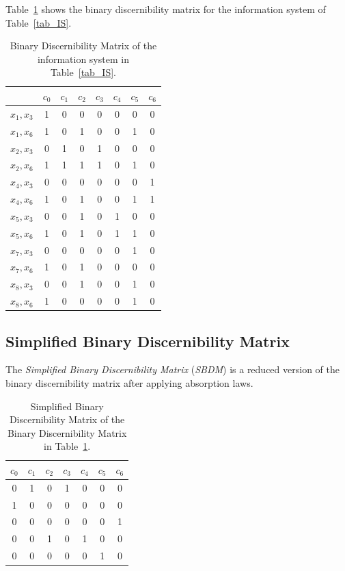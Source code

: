 \documentclass[number,preprint,review,12pt]{elsarticle}
\begin{document}
  Table~\ref{tab_BDM} shows the binary discernibility matrix for the information system of Table~\ref{tab_IS}.  
  
  \begin{table}[htb]
		\caption{Binary Discernibility Matrix of the information system in Table~\ref{tab_IS}.} \label{tab_BDM}
		\centering
 	\begin{tabular}{c|ccccccc}
 		& $c_0$ & $c_1$ & $c_2$ & $c_3$ & $c_4$ & $c_5$ & $c_6$\\
 		\hline
		$x_1,x_3$ & 1 & 0 & 0 & 0 & 0 & 0 & 0 \\
		$x_1,x_6$ & 1 & 0 & 1 & 0 & 0 & 1 & 0 \\
		$x_2,x_3$ & 0 & 1 & 0 & 1 & 0 & 0 & 0 \\
		$x_2,x_6$ & 1 & 1 & 1 & 1 & 0 & 1 & 0 \\
		$x_4,x_3$ & 0 & 0 & 0 & 0 & 0 & 0 & 1 \\
		$x_4,x_6$ & 1 & 0 & 1 & 0 & 0 & 1 & 1 \\
		$x_5,x_3$ & 0 & 0 & 1 & 0 & 1 & 0 & 0 \\
		$x_5,x_6$ & 1 & 0 & 1 & 0 & 1 & 1 & 0 \\
		$x_7,x_3$ & 0 & 0 & 0 & 0 & 0 & 1 & 0 \\
		$x_7,x_6$ & 1 & 0 & 1 & 0 & 0 & 0 & 0 \\
		$x_8,x_3$ & 0 & 0 & 1 & 0 & 0 & 1 & 0 \\
		$x_8,x_6$ & 1 & 0 & 0 & 0 & 0 & 1 & 0 
 	\end{tabular}             
  \end{table}

\subsection{Simplified Binary Discernibility Matrix}\label{sect_SBDM}
  The \textit{Simplified Binary Discernibility Matrix} (\textit{SBDM}) is a reduced version of the binary discernibility matrix after applying absorption laws. 
    
  \begin{table}[htb]
	\caption{Simplified Binary Discernibility Matrix of the Binary Discernibility Matrix in Table~\ref{tab_BDM}.}
	\centering
   	\begin{tabular}{ccccccc}\label{tab:SBDM1}
              $c_0$ & $c_1$ & $c_2$ & $c_3$ & $c_4$ & $c_5$ & $c_6$\\
          		\hline
          		0&1&0&1&0&0&0\\
          		1&0&0&0&0&0&0\\
          		0&0&0&0&0&0&1\\
          		0&0&1&0&1&0&0\\
          		0&0&0&0&0&1&0\\
   	\end{tabular}             
  \end{table}  
   
\end{document}
